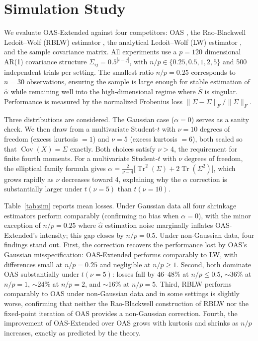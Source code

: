 \documentclass[10pt,twoside,titlepage]{article}
\begin{document}
\section{Simulation Study}\label{sec-simulation}

We evaluate OAS-Extended against four competitors: OAS \cite{OAS},
the Rao-Blackwell Ledoit--Wolf (RBLW) estimator \cite{OAS},
the analytical Ledoit--Wolf (LW) estimator \cite{LW2004}, and the
sample covariance matrix.
All experiments use a $p=120$ dimensional AR(1) covariance structure
$\Sigma_{ij} = 0.5^{|i-j|}$, with $n/p \in \{0.25, 0.5, 1, 2, 5\}$ and 500 independent
trials per setting.
The smallest ratio $n/p = 0.25$ corresponds to $n = 30$ observations, ensuring the
sample is large enough for stable estimation of $\hat{\alpha}$ while remaining well
into the high-dimensional regime where $\hat{S}$ is singular.
Performance is measured by the normalized Frobenius loss
$\lVert \hat{\Sigma} - \Sigma \rVert_F / \lVert \Sigma \rVert_F$.

Three distributions are considered.
The Gaussian case ($\alpha = 0$) serves as a sanity check.
We then draw from a multivariate Student-$t$ with $\nu = 10$ degrees of freedom
(excess kurtosis $= 1$) and $\nu = 5$ (excess kurtosis $= 6$),
both scaled so that $\operatorname{Cov}(X) = \Sigma$ exactly.
Both choices satisfy $\nu > 4$, the requirement for finite fourth moments.
For a multivariate Student-$t$ with $\nu$ degrees of freedom, the elliptical family
formula gives $\alpha = \frac{2}{\nu-4}\bigl[\operatorname{Tr}^2(\Sigma) + 2\operatorname{Tr}(\Sigma^2)\bigr]$,
which grows rapidly as $\nu$ decreases toward 4, explaining why the $\alpha$ correction
is substantially larger under $t(\nu\!=\!5)$ than $t(\nu\!=\!10)$.

Table~\ref{tab:sim} reports mean losses.
Under Gaussian data all four shrinkage estimators perform comparably (confirming no bias
when $\alpha = 0$), with the minor exception of $n/p = 0.25$ where $\hat{\alpha}$
estimation noise marginally inflates OAS-Extended's intensity; this gap closes by
$n/p = 0.5$.
Under non-Gaussian data, four findings stand out.
First, the correction recovers the performance lost by OAS's Gaussian
misspecification: OAS-Extended performs comparably to LW, with differences small at
$n/p = 0.25$ and negligible at $n/p \geq 1$.
Second, both dominate OAS substantially under $t(\nu\!=\!5)$: losses fall
by 46--48\% at $n/p \leq 0.5$, $\sim$36\% at $n/p = 1$, $\sim$24\% at $n/p = 2$, and $\sim$16\% at $n/p = 5$.
Third, RBLW performs comparably to OAS under non-Gaussian data and in some
settings is slightly worse, confirming that neither the Rao-Blackwell construction of
RBLW nor the fixed-point iteration of OAS provides a non-Gaussian correction.
Fourth, the improvement of OAS-Extended over OAS grows with kurtosis and
shrinks as $n/p$ increases, exactly as predicted by the theory.
\end{document}
